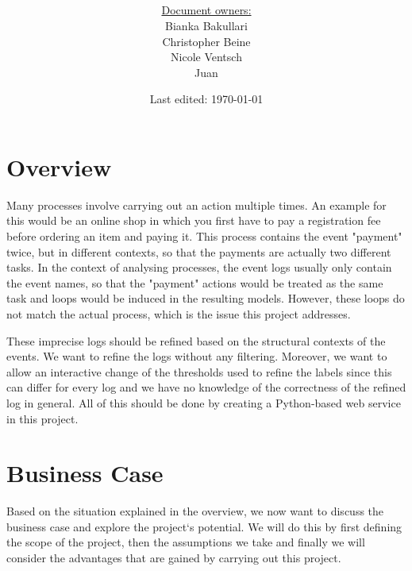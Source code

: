 \documentclass[notitlepage]{article}
\title{%
	\documentName\text{ } \\
  \large \projectName\text{ } \\
  }
\author{
	\large \underline{Document owners:}\\ 
	Bianka Bakullari\\
	\texttt{}
	Christopher Beine\\
	\texttt{}
	Nicole Ventsch\\
	\texttt{}
	Juan\\
	\texttt{}
}
\date{\small{Last edited: \today}}
\begin{document}
\begin{titlepage}
\clearpage\maketitle			%
\thispagestyle{fancy}
\tableofcontents
\end{titlepage}

\rfoot{\thepage}				%


\begin{flushleft}				%

\section{Overview}
Many processes involve carrying out an action multiple times. An example for this would be an online shop in which you first have to pay a registration fee before ordering an item and paying it. This process contains the event "payment" twice, but in different contexts, so that the payments are actually two different tasks. In the context of analysing processes, the event logs usually only contain the event names, so that the "payment" actions would be treated as the same task and loops would be induced in the resulting models. However, these loops do not match the actual process, which is the issue this project addresses. 

These imprecise logs should be refined based on the structural contexts of the events. We want to refine the logs without any filtering. Moreover, we want to allow an interactive change of the thresholds used to refine the labels since this can differ for every log and we have no knowledge of the correctness of the refined log in general. All of this should be done by creating a Python-based web service in this project.




\section{Business Case}

Based on the situation explained in the overview, we now want to discuss the business case and explore the project`s potential. We will do this by first defining the scope of the project, then the assumptions we take and finally we will consider the advantages that are gained by carrying out this project. 


\end{flushleft}
\end{document}
